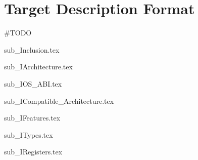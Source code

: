 \section{Target Description Format}

\#TODO

{sub_Inclusion.tex}

{sub_IArchitecture.tex}

{sub_IOS_ABI.tex}

{sub_ICompatible_Architecture.tex}

{sub_IFeatures.tex}

{sub_ITypes.tex}

{sub_IRegisters.tex}

